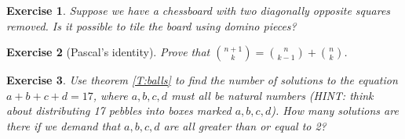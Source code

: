 \documentclass{article}
\theoremstyle{plain}
\newtheorem{Q}{Exercise}{\bfseries}{\upshape}
\begin{document}
\begin{Q}
Suppose we have a chessboard with two diagonally opposite squares removed. Is it possible to tile the board using domino pieces?  
\end{Q}
\begin{comment}
\textbf{Solution:}
No. Every domino must cover one white square and one black square, so we can only ever cover the same number of black and white squares with dominoes.  If we remove two diagonally opposite squares then we remove two squares that are the same colour, and there are not the same number of squares for each colour anymore.  
\end{comment}

\begin{Q}[Pascal's identity]
Prove that ${n+1\choose k} = {n \choose k-1} + {n\choose k}$.
\end{Q}
\begin{comment}
\textbf{Solution:}
There are two basic ways to do this. First, a purely formal proof:
\begin{align*}
{n \choose k-1} + {n\choose k} &= \frac{n!}{(k-1)!(n-(k-1))!} + \frac{n!}{k!(n-k)!} \\
&= \frac{n!}{(k-1)!(n+1 - k)!} + \frac{n!}{k!(n-k)!} \\
&=\frac{kn! + (n+1 - k)n!}{k!(n+1 - k)!}\\
&= \frac{(n+1)n!}{k!(n+1 - k)!}\\
&= \frac{(n+1)!}{k!((n+1) - k)!}\\
&= {n+1\choose k}.
\end{align*}
Alternatively, we can think conceptually. Let $X$ be a set of $n+1$ objects. Then ${n+1\choose k}$ is the number of ways we can choose $k$ objects from $X$ when the order doesn't matter. Let $x$ be some element of $X$. When we choose $k$ elements of $X$, we can either choose $x$ or not. This gives two cases. First, if we choose $x$, then we have to choose $k-1$ elements from the remaining $n$ elements of $X\setminus\{x\}$. There are ${n \choose k-1}$ ways to do this. Alternatively, if we don't choose $x$, then we choose all $k$ elements from the remaining $n$ elements of $X\setminus\{x\}$. There are ${n\choose k}$ ways to do this. It follows that ${n+1\choose k} = {n \choose k-1} + {n\choose k}$ as claimed. 
\end{comment}

\begin{Q}
Use theorem \ref{T:balls} to find the number of solutions to the equation $a+b+c+d = 17$, where $a,b,c,d$ must all be natural numbers (HINT: think about distributing 17 pebbles into boxes marked $a,b,c,d$). How many solutions are there if we demand that $a,b,c,d$ are all greater than or equal to 2?
\end{Q}
\begin{comment}
\textbf{Solution:}
This is putting 17 balls in 4 boxes. Using theorem 2.14 the answer is ${4+17-1 \choose 17} = {20 \choose 17} = 1140$. Forcing each of $a,b,c,d$ to be at least 2 is equivalent to fixing 8 of the pebbles, which leaves 9. So the answer to the second part is ${4+9-1 \choose 9} = {12 \choose 9} = 220$. 
\end{comment}
\end{document}
